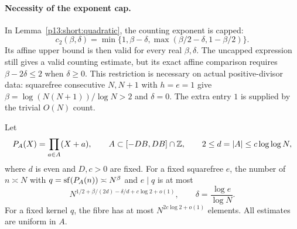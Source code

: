 \paragraph{Necessity of the exponent cap.}
In Lemma~\ref{p13:short:quadratic}, the counting exponent is capped:
\[
 c_2(\beta,\delta)
   =\min\{1,\beta-\delta,\max(\beta/2-\delta,1-\beta/2)\}.
\]
Its affine upper bound is then valid for every real $\beta,\delta$.
The uncapped expression still gives a valid counting estimate, but
its exact affine comparison requires $\beta-2\delta\le2$ when
$\delta\ge0$. This restriction is necessary on actual positive-divisor
data: squarefree consecutive $N,N+1$ with $h=e=1$ give
$\beta=\log(N(N+1))/\log N>2$ and $\delta=0$.
The extra entry $1$ is supplied by the trivial $O(N)$ count.


\begin{lemma}
\label{p13:short:split}
Let
\[
 P_A(X)=\prod_{a\in A}(X+a),\qquad
 A\subset[-DB,DB]\cap\Z,\qquad
 2\le d=|A|\le c\log\log N,
\]
where \(d\) is even and \(D,c>0\) are fixed.
For a fixed squarefree \(e\), the number of \(n\asymp N\)
with \(q=\sf(P_A(n))\asymp N^\beta\) and \(e\mid q\) is at most
\begin{equation}
 N^{1/2+\beta/(2d)-\delta/d+c\log2+o(1)},
 \qquad \delta=\frac{\log e}{\log N}.
 \label{p13:short:split-count}
\end{equation}
For a fixed kernel \(q\), the fibre has at most
\(N^{2c\log2+o(1)}\) elements. All estimates are uniform in \(A\).
\end{lemma}


